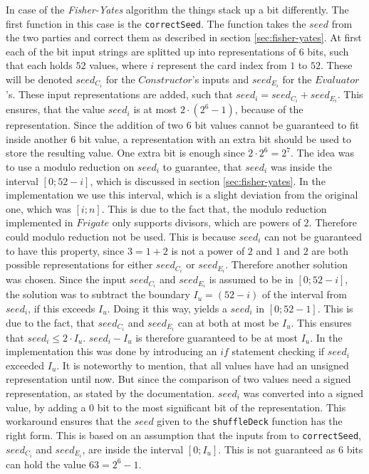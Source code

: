 \documentclass[twoside,11pt,openright]{report}
\newcommand{\FY}{\textit{Fisher-Yates} }
\begin{document}
In case of the \FY algorithm the things stack up a bit differently. The first function in this case is the \verb|correctSeed|. The function takes the $seed$ from the two parties and correct them as described in section \ref{sec:fisher-yates}. At first each of the bit input strings are splitted up into representations of $6$ bits, such that each holds $52$ values, where $i$ represent the card index from $1$ to $52$. These will be denoted $seed_{C_i}$ for the $Constructor$'s inputs and $seed_{E_i}$ for the $Evaluator$'s. These input representations are added, such that $seed_i = seed_{C_i} + seed_{E_i}$. This ensures, that the value $seed_i$ is at most $2\cdot (2^6 - 1)$, because of the representation. Since the addition of two $6$ bit values cannot be guaranteed to fit inside another $6$ bit value, a representation with an extra bit should be used to store the resulting value. One extra bit is enough since $2\cdot2^6=2^7$.
The idea was to use a modulo reduction on $seed_i$ to guarantee, that $seed_i$ was inside the interval $[0;52-i]$, which is discussed in section \ref{sec:fisher-yates}. In the implementation we use this interval, which is a slight deviation from the original one, which was $[i;n]$. This is due to the fact that, the modulo reduction implemented in $Frigate$ only supports divisors, which are powers of $2$. Therefore could modulo reduction not be used. This is because $seed_i$ can not be guaranteed to have this property, since $3=1 + 2$ is not a power of $2$ and $1$ and $2$ are both possible representations for either $seed_{C_i}$ or $seed_{E_i}$. Therefore another solution was chosen. Since the input $seed_{C_i}$ and $seed_{E_i}$ is assumed to be in $[0;52-i]$, the solution was to subtract the boundary $I_u=(52-i)$ of the interval from $seed_i$, if this exceeds $I_u$. Doing it this way, yields a $seed_i$ in $[0;52-1]$. This is due to the fact, that $seed_{C_i}$ and $seed_{E_i}$ can at both  at most be $I_u$. This ensures that $seed_i \leq 2\cdot I_u$. $seed_i - I_u$ is therefore guaranteed to be at most $I_u$.
In the implementation this was done by introducing an $if$ statement checking if $seed_i$ exceeded $I_u$. It is noteworthy to mention, that all values have had an unsigned representation until now. But since the comparison of two values need a signed representation, as stated by the documentation. $seed_i$ was converted into a signed value, by adding a $0$ bit to the most significant bit of the representation. This workaround ensures that the $seed$ given to the \verb|shuffleDeck| function has the right form. This is based on an assumption that the inputs from to \verb|correctSeed|, $seed_{C_i}$ and $seed_{E_i}$, are inside the interval $[0;I_u]$. This is not guaranteed as $6$ bits can hold the value $63=2^6-1$.
\end{document}
